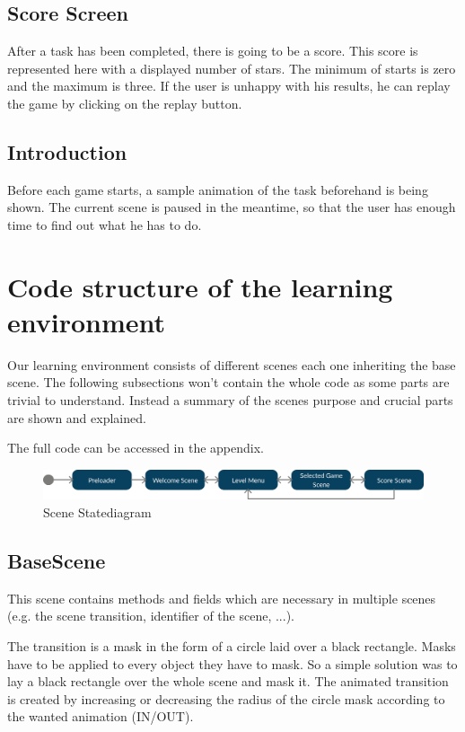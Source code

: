 \subsection{Score Screen}\label{subsec:score-screen}
After a task has been completed, there is going to be a score.
This score is represented here with a displayed number of stars.
The minimum of starts is zero and the maximum is three.
If the user is unhappy with his results, he can replay the game by clicking on the replay button.

\subsection{Introduction}\label{subsec:introduction}
Before each game starts, a sample animation of the task beforehand is being shown.
The current scene is paused in the meantime, so that the user has enough time to find out what he has to do.

\section{Code structure of the learning environment}\label{sec:code-structure-of-the-learning-environment}
Our learning environment consists of different scenes each one inheriting the base scene.
The following subsections won't contain the whole code as some parts are trivial to understand.
Instead a summary of the scenes purpose and crucial parts are shown and explained.

The full code can be accessed in the appendix.

\begin{figure}[H]
    \centering
    \includegraphics[width=1\textwidth]{figures/statediagram}
    \caption{Scene Statediagram}
    \label{fig:statediagram}
\end{figure}

\subsection{BaseScene}\label{subsec:basescene}
This scene contains methods and fields which are necessary in multiple scenes
(e.g. the scene transition, identifier of the scene, ...).

The transition is a mask in the form of a circle laid over a black rectangle.
Masks have to be applied to every object they have to mask.
So a simple solution was to lay a black rectangle over the whole scene and mask it.
The animated transition is created by increasing or decreasing the radius of the circle
mask according to the wanted animation (IN/OUT).

